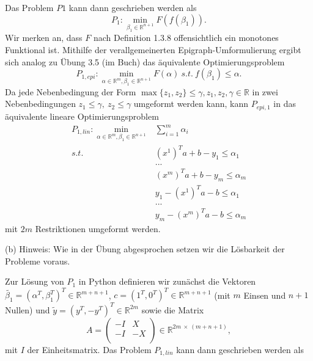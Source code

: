 \documentclass[ngerman, a4paper,12pt]{article}
\begin{document}
Das Problem $P1$ kann dann geschrieben werden als
\begin{equation*}
	P_1: \min_{\beta_1 \in \mathbb{R}^{n+1}} F(f(\beta_1)).
\end{equation*}
Wir merken an, dass $F$ nach Definition 1.3.8 offensichtlich ein monotones Funktional ist. Mithilfe der verallgemeinerten Epigraph-Umformulierung ergibt sich analog zu Übung 3.5 (im Buch) das äquivalente Optimierungsproblem
\begin{equation*}
	P_{1, epi}:\min_{\alpha \in \mathbb{R}^m, \beta_1 \in \mathbb{R}^{n+1}} F(\alpha) \ s.t. \ f(\beta_1) \leq \alpha.
\end{equation*}
Da jede Nebenbedingung der Form $\max\{z_1, z_2\} \leq \gamma, z_1, z_2, \gamma \in \mathbb{R}$ in zwei Nebenbedingungen $z_1 \leq \gamma, \ z_2 \leq \gamma$ umgeformt werden kann, kann $P_{epi, 1}$ in das äquivalente lineare Optimierungsproblem 
\begin{equation*}
	\begin{split}
	P_{1, lin}: \min_{\alpha \in \mathbb{R}^m, \beta_1 \in \mathbb{R}^{n+1}} & \sum_{i=1}^{m} \alpha_i \\
	s.t. \ &(x^1)^Ta + b -y_1 \leq \alpha_1 \\
	& ... \\
	& (x^m)^Ta + b -y_m \leq \alpha_m \\
	& y_1 - (x^1)^Ta - b \leq \alpha_1 \\
	& ... \\
	& y_m - (x^m)^Ta - b \leq \alpha_m 
	\end{split}
\end{equation*}
mit $2m$ Restriktionen umgeformt werden. \par
(b) Hinweis: Wie in der Übung abgesprochen setzen wir die Lösbarkeit der Probleme voraus.\par Zur Lösung von $P_1$ in Python definieren wir zunächst die Vektoren $\tilde{\beta_1} = (\alpha^T, \beta_1^T)^T \in \mathbb{R}^{m+n+1}$, $c = (1^T, 0^T)^T \in \mathbb{R}^{m+n+1}$ (mit $m$ Einsen und $n+1$ Nullen) und $\tilde{y}= (y^T, -y^T)^T \in \mathbb{R}^{2m}$ sowie die Matrix
\begin{equation*}
	A = \begin{pmatrix}
					-I &X \\
					-I & -X \\
					\end{pmatrix} \in \mathbb{R}^{2m \ \times \ (m+n+1)},
\end{equation*}
mit $I$ der Einheitsmatrix. Das Problem $P_{1, lin}$ kann dann geschrieben werden als
\end{document}
